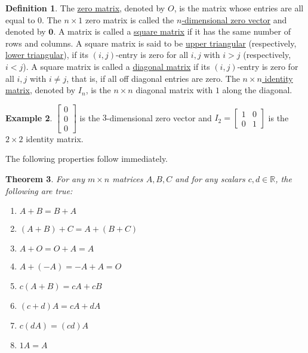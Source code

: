 \documentclass[12pt,letterpaper]{book}
\numberwithin{equation}{section}
\newtheorem{thm}{\textbf{Theorem}}[section]
\theoremstyle{definition}
\newtheorem{defi}[thm]{\textbf{Definition}}
\newtheorem{example}[thm]{\textbf{Example}}
\newcommand{\veczero}{\bm{0}}
\begin{document}
\begin{defi} The \underline{zero matrix}, denoted by $O$, is the matrix whose entries are all equal to $0$. The $n\times 1$ zero matrix is called the \underline{$n$-dimensional zero vector} and denoted by
$\veczero$. A matrix is called a \underline{square matrix} if it has the same number of rows and columns. A square matrix is said to be \underline{upper triangular} (respectively, \underline{lower triangular}), if its $(i,j)$-entry is zero for all $i,j$ with $i>j$ (respectively, $i<j$).  A square matrix is called a \underline{diagonal matrix} if its $(i,j)$-entry is zero for all $i,j$ with $i\neq j$, that is, if all off diagonal entries are zero. The \underline{$n\times n$ identity matrix}, denoted by $I_n$, is the $n\times n$ diagonal matrix with $1$ along the diagonal.
\end{defi}

\begin{example}
$\left[\begin{array}{r} 0 \\ 0 \\ 0
\end{array}\right]$ is the $3$-dimensional zero vector and $I_2=\left[\begin{array}{rr} 1 & 0 \\ 0 & 1
\end{array}\right]$ is the $2\times 2$ identity matrix.
\end{example}

The following properties follow immediately.

\begin{thm} \label{matrix addition formula} For any $m\times n$ matrices $A,B,C$ and for any scalars $c,d\in
\mathbb{R}$, the following are true:
\begin{multicols}{2}
\begin{enumerate}
\item $A+B=B+A$
\item $(A+B)+C=A+(B+C) $
\item $A+O=O+A=A$
\item $ A+(-A)=-A+A=O$
\item $  c(A+B)=cA+cB $
\item $ (c+d)A=cA+dA $
\item $ c(dA)=(cd)A$
\item $ 1A=A$
\end{enumerate}
\end{multicols}
\end{thm}
\end{document}
